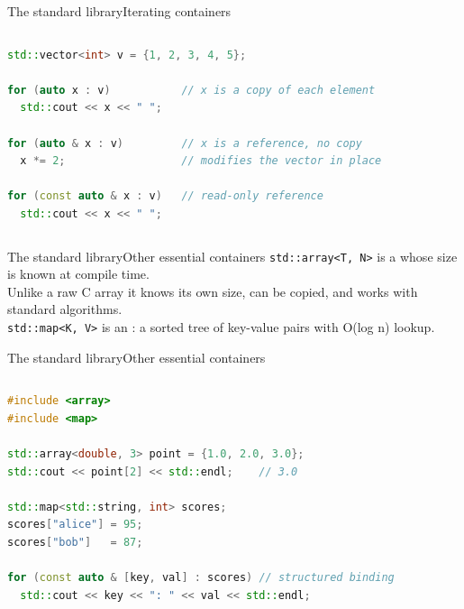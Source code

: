 \begin{frame}[fragile]{The standard library}{Iterating containers}
  \begin{columns}
		\begin{lstlisting}[style=codebeamer, language=C++, caption=Iteration with \texttt{auto} and range-based \texttt{for}.]
std::vector<int> v = {1, 2, 3, 4, 5};

for (auto x : v)           // x is a copy of each element
  std::cout << x << " ";

for (auto & x : v)         // x is a reference, no copy
  x *= 2;                  // modifies the vector in place

for (const auto & x : v)   // read-only reference
  std::cout << x << " ";
    \end{lstlisting}
	\end{columns}
\end{frame}
\begin{frame}{The standard library}{Other essential containers}
	\justifying
	\texttt{std::array<T, N>} is a  whose size is known at compile time.\\
	Unlike a raw C array it knows its own size, can be copied, and works with standard algorithms.\\
	\bigskip
	\texttt{std::map<K, V>} is an : a sorted tree of key-value pairs with O(log n) lookup.
\end{frame}
\begin{frame}[fragile]{The standard library}{Other essential containers}
  \begin{columns}
		\begin{lstlisting}[style=codebeamer, language=C++, caption=\texttt{std::array} and \texttt{std::map} basics.]
#include <array>
#include <map>

std::array<double, 3> point = {1.0, 2.0, 3.0};
std::cout << point[2] << std::endl;    // 3.0

std::map<std::string, int> scores;
scores["alice"] = 95;
scores["bob"]   = 87;

for (const auto & [key, val] : scores) // structured binding
  std::cout << key << ": " << val << std::endl;
    \end{lstlisting}
	\end{columns}
\end{frame}
